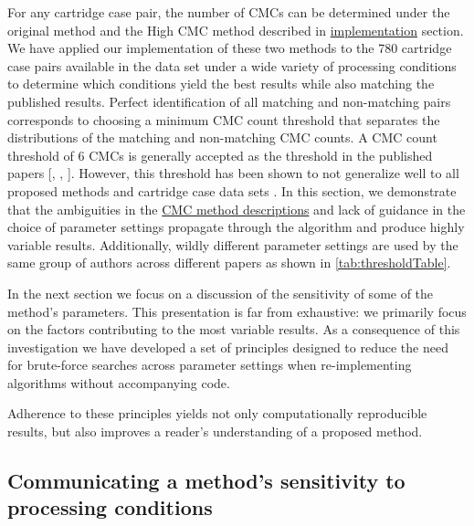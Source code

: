 For any cartridge case pair, the number of CMCs can be determined under
the original method and the High CMC method described in
\protect\hyperlink{implementation}{implementation} section. We have
applied our implementation of these two methods to the 780 cartridge
case pairs available in the \citet{fadul_empirical_2011} data set under
a wide variety of processing conditions to determine which conditions
yield the best results while also matching the published results.
Perfect identification of all matching and non-matching pairs
corresponds to choosing a minimum CMC count threshold that separates the
distributions of the matching and non-matching CMC counts. A CMC count
threshold of 6 CMCs is generally accepted as the threshold in the
published papers {[}\citet{tong_improved_2015},
\citet{song_estimating_2018}, \citet{song_proposed_2013}{]}. However,
this threshold has been shown to not generalize well to all proposed
methods and cartridge case data sets \citep{chen_convergence_2017}. In
this section, we demonstrate that the ambiguities in the
\href{cmcMethod}{CMC method descriptions} and lack of guidance in the
choice of parameter settings propagate through the algorithm and produce
highly variable results. Additionally, wildly different parameter
settings are used by the same group of authors across different papers
as shown in \autoref{tab:thresholdTable}.

In the next section we focus on a discussion of the sensitivity of some
of the method's parameters. This presentation is far from exhaustive: we
primarily focus on the factors contributing to the most variable
results. As a consequence of this investigation we have developed a set
of principles designed to reduce the need for brute-force searches
across parameter settings when re-implementing algorithms without
accompanying code.

Adherence to these principles yields not only computationally
reproducible results, but also improves a reader's understanding of a
proposed method.

\hypertarget{communicating-a-methods-sensitivity-to-processing-conditions}{%
\subsection{Communicating a method's sensitivity to processing
conditions}\label{communicating-a-methods-sensitivity-to-processing-conditions}}

